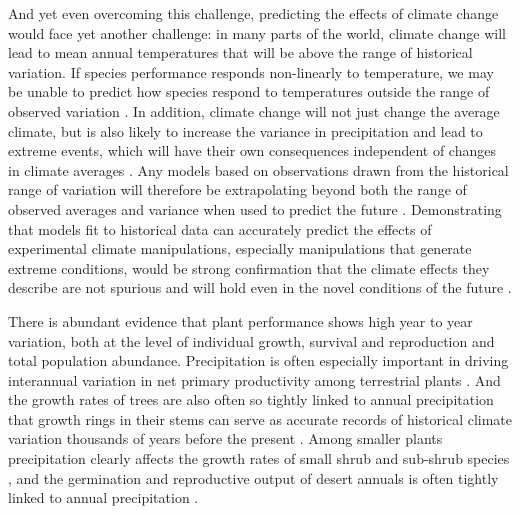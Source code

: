 \documentclass[11pt]{article}
\begin{document}
\begin{doublespacing}
And yet even overcoming this challenge, predicting the effects of climate change would face yet another challenge: in many parts of the world, climate change will lead to mean annual temperatures that will be above the range of historical variation. If species performance responds non-linearly to temperature, we may be unable to predict how species respond to temperatures outside the range of observed variation \citep{doak_demographic_2010}. In addition, climate change will not just change the average climate, but is also likely to increase the variance in precipitation and lead to extreme events, which will have their own consequences independent of changes in climate averages \citep{drake_population_2005,jentsch_new_2007}. Any models based on observations drawn from the historical range of variation will therefore be extrapolating beyond both the range of observed averages and variance when used to predict the future \citep{williams_novel_2007}. Demonstrating that models fit to historical data can accurately predict the effects of experimental climate manipulations, especially manipulations that generate extreme conditions, would be strong confirmation that the climate effects they describe are not spurious and will hold even in the novel conditions of the future \cite{adler_can_2013}.  

There is abundant evidence that plant performance shows high year to year variation, both at the level of individual growth, survival and reproduction and total population abundance. Precipitation is often especially important in driving interannual variation in net primary productivity among terrestrial plants \citep{knapp_variation_2001,hsu_anticipating_2014}. And the growth rates of trees are also often so tightly linked to annual precipitation that growth rings in their stems can serve as accurate records of historical climate variation thousands of years before the present \citep{yang_3500-year_2014}. Among smaller plants precipitation clearly affects the growth rates of small shrub and sub-shrub species \citep{srur_annual_2009,franklin_growth_2013}, and the germination and reproductive output of desert annuals is often tightly linked to annual precipitation \citep{venable_bet_2007}. 


\end{doublespacing}
\end{document}
